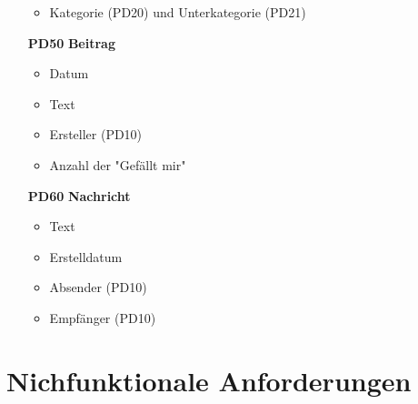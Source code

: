 \documentclass[parskip=full]{scrartcl}
\begin{document}
\begin{itemize}
\begin{itemize}[nosep]
				\item Kategorie (PD20) und Unterkategorie (PD21)
			\end{itemize}
		\item[\textbf{PD50}] \textbf{Beitrag}
			\begin{itemize}[nosep]
				\item Datum
				\item Text
				\item Ersteller (PD10)
				\item Anzahl der "Gefällt mir"
			\end{itemize}
		\item[\textbf{PD60}] \textbf{Nachricht}
			\begin{itemize}[nosep]
				\item Text
				\item Erstelldatum
				\item Absender (PD10)
				\item Empfänger (PD10)	
			\end{itemize}
	\end{itemize}
	
	\newpage
	\section{Nichfunktionale Anforderungen}
			
\end{document}
